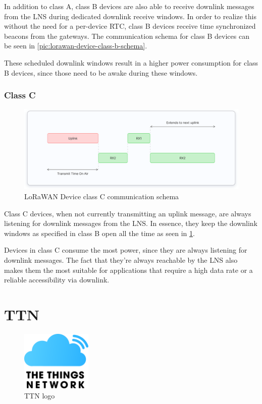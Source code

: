 In addition to class A, class B devices are also able to receive downlink messages from the \ac{LNS} during dedicated downlink receive windows.
In order to realize this without the need for a per-device \ac{RTC}, class B devices receive time synchronized beacons from the gateways.
The communication schema for class B devices can be seen in \cref{pic:lorawan-device-class-b-schema}.

These scheduled downlink windows result in a higher power consumption for class B devices, since those need to be awake during these windows.

\subsubsection{Class C}

\begin{figure}[h]
    \centering
    \includegraphics[width=1\textwidth]{pictures/device-classes/class-c.png}
    \caption{\ac{LoRaWAN} Device class C communication schema~\protect\cite{the_things_industries_bv_device_nodate}}\label{pic:lorawan-device-class-c-schema}
\end{figure}

Class C devices, when not currently transmitting an uplink message, are always listening for downlink messages from the \ac{LNS}.
In essence, they keep the downlink windows as specified in class B open all the time as seen in \cref{pic:lorawan-device-class-c-schema}.

Devices in class C consume the most power, since they are always listening for downlink messages.
The fact that they're always reachable by the \ac{LNS} also makes them the most suitable for applications that require a high data rate or a reliable accessibility via downlink.

\section{\acf{TTN}}

\begin{figure}[h]
    \centering
    \includegraphics[width=0.3\textwidth]{pictures/logos/TTN-logo.eps}
    \caption{\acf{TTN} logo~\protect\cite{the_things_industries_bv_quick_nodate}}
\end{figure}

